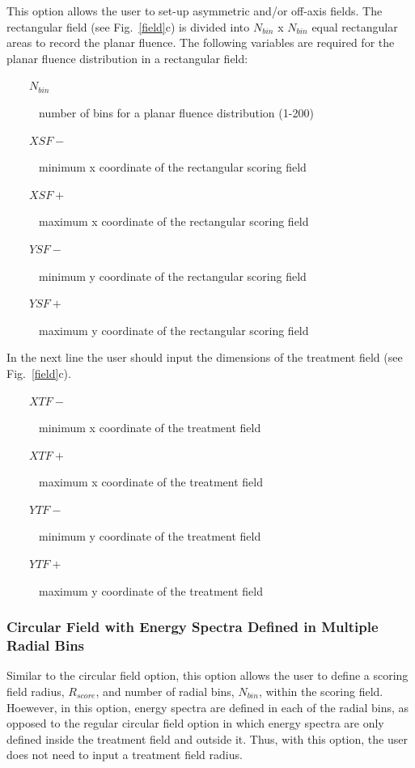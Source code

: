 \documentclass[12pt,twoside]{article}
\begin{document}
This option allows the user to set-up asymmetric and/or off-axis fields. The rectangular field (see Fig.~\ref{field}c) is divided into $N_{bin}$ x $N_{bin}$ equal rectangular areas to record the planar fluence. The following variables are required for the planar fluence distribution in a rectangular field:
\begin{description}
\item [~~~~$N_{bin}$] number of bins for a planar fluence distribution (1-200)
\item [~~~~$XSF-$] minimum x coordinate of the rectangular scoring field
\item [~~~~$XSF+$] maximum x coordinate of the rectangular scoring field
\item [~~~~$YSF-$] minimum y coordinate of the rectangular scoring field
\item [~~~~$YSF+$] maximum y coordinate of the rectangular scoring field
\end{description}
In the next line the user should input the dimensions of the treatment field (see Fig.~\ref{field}c).
\begin{description}
\item [~~~~$XTF-$] minimum x coordinate of the treatment field
\item [~~~~$XTF+$] maximum x coordinate of the treatment field
\item [~~~~$YTF-$] minimum y coordinate of the treatment field
\item [~~~~$YTF+$] maximum y coordinate of the treatment field
\end{description}

\subsubsection{Circular Field with Energy Spectra Defined in Multiple Radial
               Bins}

Similar to the circular field option, this option allows the user to define
a scoring field radius, $R_{score}$, and number
of radial bins, $N_{bin}$, within the scoring field.  Hoewever, in this option,
energy spectra are defined in each of the radial bins, as opposed to the
regular circular field option in which energy spectra are only defined inside
the treatment field and outside it.  Thus, with this option, the user does
not need to input a treatment field radius.
\end{document}
